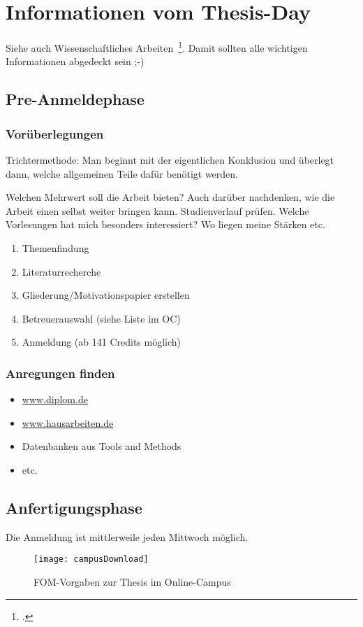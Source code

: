 \newpage
\section{Informationen vom Thesis-Day}
Siehe auch Wissenschaftliches Arbeiten~\footcite[Vgl. ][Seite 1]{Balzert.2008}. Damit sollten alle wichtigen Informationen abgedeckt sein ;-)

\subsection{Pre-Anmeldephase}
\subsubsection{Vorüberlegungen}
Trichtermethode: Man beginnt mit der eigentlichen  Konklusion und überlegt dann, welche allgemeinen Teile dafür benötigt werden. 

Welchen Mehrwert soll die Arbeit bieten? Auch darüber nachdenken, wie die Arbeit einen selbst weiter bringen kann. Studienverlauf prüfen. Welche Vorlesungen hat mich besonders interessiert? Wo liegen meine Stärken etc.

\begin{enumerate}
\item Themenfindung
\item Literaturrecherche
\item Gliederung/Motivationspapier erstellen
\item Betreuerauswahl (siehe Liste im  OC)
\item Anmeldung (ab 141 Credits möglich)
\end{enumerate}

\subsubsection{Anregungen finden}
\begin{itemize}
\item \href{http://www.diplom.de}{www.diplom.de}
\item \href{http://www.hausarbeiten.de.de}{www.hausarbeiten.de}
\item Datenbanken aus Tools and Methods
\item etc.
\end{itemize}

\newpage
\subsection{Anfertigungsphase}
Die Anmeldung ist mittlerweile jeden Mittwoch möglich. 
\begin{figure}[H]
\begin{center}
\texttt{[image: campusDownload]}
\caption{FOM-Vorgaben zur Thesis im Online-Campus}
\end{center}
\end{figure}

